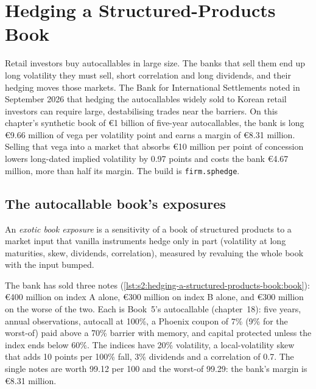 \chapter{Hedging a Structured-Products Book}\label{ch:s2:hedging-a-structured-products-book}

Retail investors buy autocallables in large size. The banks that sell them end up long volatility they must sell, short correlation and long
dividends, and their hedging moves those markets. The Bank for International Settlements noted in September 2026 that hedging the autocallables widely
sold to Korean retail investors can require large, destabilising trades near the barriers. On this chapter's synthetic book of \euro1 billion of
five-year autocallables, the bank is long \euro9.66 million of vega per volatility point and earns a margin of \euro8.31 million. Selling that vega into
a market that absorbs \euro10 million per point of concession lowers long-dated implied volatility by 0.97 points and costs the bank \euro4.67 million,
more than half its margin. The build is \texttt{firm.sphedge}.

\section{The autocallable book's exposures}

\begin{definition}\label{def:s2:hedging-a-structured-products-book:exposure}
An \emph{exotic book exposure} is a sensitivity of a book of structured products to a market input that vanilla
instruments hedge only in part (volatility at long maturities, skew, dividends, correlation), measured by revaluing the whole book with the input
bumped.
\end{definition}

The bank has sold three notes (\cref{lst:s2:hedging-a-structured-products-book:book}): \euro400 million on index A alone, \euro300 million on index B
alone, and \euro300 million on the worse of the two. Each is Book~5's autocallable (chapter~18): five years, annual observations, autocall at 100\%, a
Phoenix coupon of 7\% (9\% for the worst-of) paid above a 70\% barrier with memory, and capital protected unless the index ends below 60\%. The
indices have 20\% volatility, a local-volatility skew that adds 10 points per 100\% fall, 3\% dividends and a correlation of 0.7. The single notes are
worth 99.12 per 100 and the worst-of 99.29: the bank's margin is \euro8.31 million.

